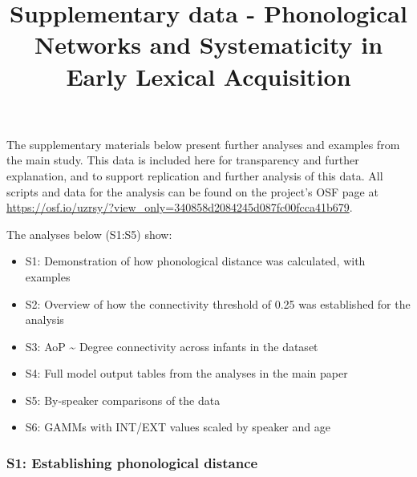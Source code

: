 \documentclass[
  man,floatsintext]{apa6}
\title{Supplementary data - Phonological Networks and Systematicity in Early Lexical Acquisition}
\author{\phantom{0}}
\date{}
\affiliation{\phantom{0}}
\providecommand{\tightlist}{%
  \setlength{\itemsep}{0pt}\setlength{\parskip}{0pt}}
\begin{document}
\maketitle

The supplementary materials below present further analyses and examples from the main study. This data is included here for transparency and further explanation, and to support replication and further analysis of this data. All scripts and data for the analysis can be found on the project's OSF page at \url{https://osf.io/uzrsy/?view_only=340858d2084245d087fc00fcca41b679}.

The analyses below (S1:S5) show:

\begin{itemize}
\tightlist
\item
  S1: Demonstration of how phonological distance was calculated, with examples
\item
  S2: Overview of how the connectivity threshold of 0.25 was established for the analysis
\item
  S3: AoP \textasciitilde{} Degree connectivity across infants in the dataset
\item
  S4: Full model output tables from the analyses in the main paper
\item
  S5: By-speaker comparisons of the data
\item
  S6: GAMMs with INT/EXT values scaled by speaker and age
\end{itemize}

\hypertarget{s1-establishing-phonological-distance}{%
\subsubsection{S1: Establishing phonological distance}\label{s1-establishing-phonological-distance}}
\end{document}
